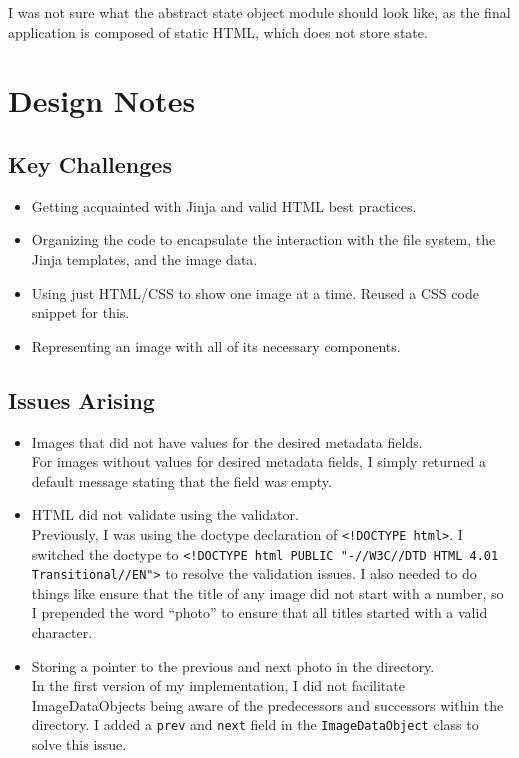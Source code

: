 \documentclass[11pt,letterpaper]{article}
\begin{document}
I was not sure what the abstract state object module should look like, as the final application is composed of static HTML, which does not store state.

\section{Design Notes}
\subsection{Key Challenges}
\begin{itemize}
\item Getting acquainted with Jinja and valid HTML best practices. 
\item Organizing the code to encapsulate the interaction with the file system, the Jinja templates, and the image data.
\item Using just HTML/CSS to show one image at a time. Reused a CSS code snippet for this.
\item Representing an image with all of its necessary components.
\end{itemize}

\subsection{Issues Arising}
\begin{itemize}
\item Images that did not have values for the desired metadata fields.\\
For images without values for desired metadata fields, I simply returned a default message stating that the field was empty.
\item HTML did not validate using the validator.\\
Previously, I was using the doctype declaration of \texttt{<!DOCTYPE html>}. I switched the doctype to \texttt{<!DOCTYPE html PUBLIC "-//W3C//DTD HTML 4.01 Transitional//EN">} to resolve the validation issues. I also needed to do things like ensure that the title of any image did not start with a number, so I prepended the word ``photo'' to ensure that all titles started with a valid character.
\item Storing a pointer to the previous and next photo in the directory.\\
In the first version of my implementation, I did not facilitate ImageDataObjects being aware of the predecessors and successors within the directory. I added a \texttt{prev} and \texttt{next} field in the \texttt{ImageDataObject} class to solve this issue.
\end{itemize}
\end{document}
